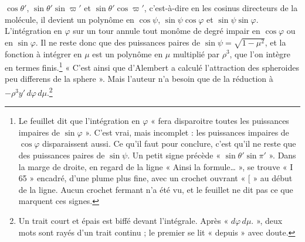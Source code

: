 \documentclass[11pt,a4paper]{article}
\begin{document}
\(\cos\theta'\), \(\sin\theta'\sin\varpi'\) et \(\sin\theta'\cos\varpi'\),
c'est-à-dire en les cosinus directeurs de la molécule, il devient un polynôme
en \(\cos\psi\), \(\sin\psi\cos\varphi\) et \(\sin\psi\sin\varphi\).
L'intégration en \(\varphi\) sur un tour annule tout monôme de degré impair en
\(\cos\varphi\) ou en \(\sin\varphi\). Il ne reste donc que des puissances
paires de \(\sin\psi=\sqrt{1-\mu^2}\), et la fonction à intégrer en \(\mu\) est
un polynôme en \(\mu\) multiplié par \(\rho^3\), que l'on intègre en termes
finis.\footnote{Le feuillet dit que l'intégration en \(\varphi\) « fera
disparoitre toutes les puissances impaires de \(\sin\varphi\) ». C'est vrai,
mais incomplet : les puissances impaires de \(\cos\varphi\) disparaissent
aussi. Ce qu'il faut pour conclure, c'est qu'il ne reste que des puissances
paires de \(\sin\psi\). Un petit signe précède « \(\sin\theta'\sin\pi'\) ».
Dans la marge de droite, en regard de la ligne « Ainsi la formule… », se trouve
« I 65 » encadré, d'une plume plus fine, avec un crochet ouvrant « [ » au début
de la ligne. Aucun crochet fermant n'a été vu, et le feuillet ne dit pas ce que
marquent ces signes.} « C'est ainsi que d'Alembert a calculé l'attraction des
spheroides peu differens de la sphere ». Mais l'auteur n'a besoin que de la
réduction à \(-\rho^3y'\,d\varphi\,d\mu\).\footnote{Un trait court et épais
est biffé devant l'intégrale. Après « \(d\varphi\,d\mu\). », deux mots sont
rayés d'un trait continu ; le premier se lit « depuis » avec doute.}
\end{document}
